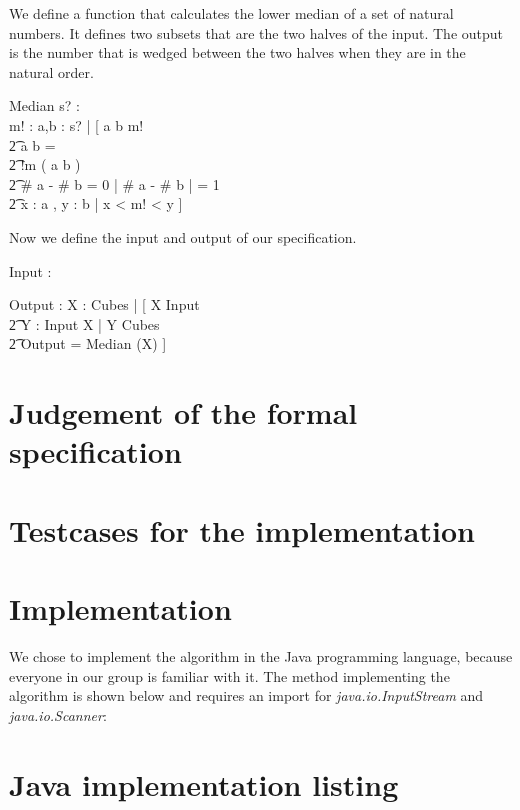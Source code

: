 \documentclass[12pt]{article}
\begin{document}
We define a function that calculates the lower median of a set of natural numbers. It defines two subsets that are the two halves of the input. The output is the number that is wedged between the two halves when they are in the natural order.
\begin{schema}{Median}
s? : \power \nat \\
m! : \nat
\where
\exists a,b : \power s? | [ \: a \union b \union m! \\
                          \t2 a \cap b = \empty \\
                          \t2 !m \notin ( a \union b ) \\
                          \t2 \# a - \# b = 0 \: \vee | \# a - \# b | = 1 \\
                          \t2 \forall x : a , y : b | x < m! < y \: ]
\end{schema}

Now we define the input and output of our specification.
\begin{axdef}
Input : \seq \nat
\end{axdef}

\begin{axdef}
Output : \nat
\where
\exists X : Cubes | [ \: X \subseteq \ran Input \\ \t2 \forall Y : \ran Input \setminus X | Y \not\subseteq Cubes \\ \t2 Output = Median (X) \: ]
\end{axdef}

\section{Judgement of the formal specification}

\section{Testcases for the implementation}

\section{Implementation}
We chose to implement the algorithm in the Java programming language, because everyone in our group is familiar with it. The method implementing the algorithm is shown below and requires an import for \textsl{java.io.InputStream} and \textsl{java.io.Scanner}:

\appendix

\section{Java implementation listing}
\end{document}
